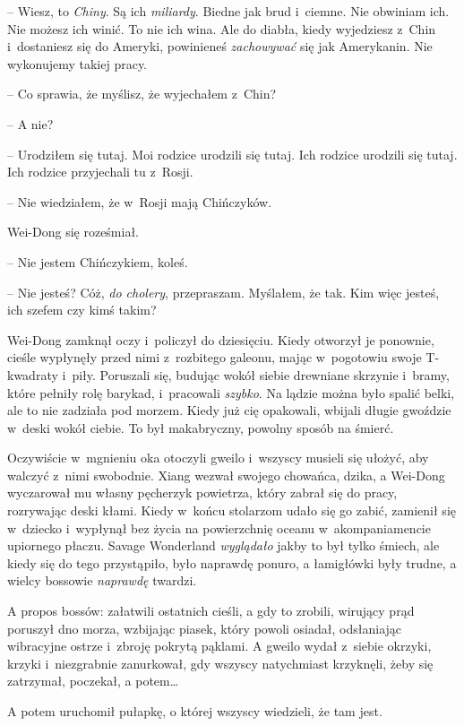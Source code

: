 \documentclass[oneside,polish,11pt,rmheadings]{mwbk}
\begin{document}
-- Wiesz, to \textit{Chiny}. Są ich \textit{miliardy}. Biedne jak brud i~ciemne. Nie obwiniam ich. Nie możesz ich winić. To nie ich wina. Ale do diabła, kiedy wyjedziesz z~Chin i~dostaniesz się do Ameryki, powinieneś \textit{zachowywać }się jak Amerykanin. Nie wykonujemy takiej pracy. 


-- Co sprawia, że myślisz, że wyjechałem z~Chin? 


-- A nie? 


-- Urodziłem się tutaj. Moi rodzice urodzili się tutaj. Ich rodzice urodzili się tutaj. Ich rodzice przyjechali tu z~Rosji. 


-- Nie wiedziałem, że w~Rosji mają Chińczyków. 


Wei-Dong się roześmiał. 

-- Nie jestem Chińczykiem, koleś. 


-- Nie jesteś? Cóż, \textit{do cholery}, przepraszam. Myślałem, że tak. Kim więc jesteś, ich szefem czy kimś takim? 


Wei-Dong zamknął oczy i~policzył do dziesięciu. Kiedy otworzył je ponownie, cieśle wypłynęły przed nimi z~rozbitego galeonu, mając w~pogotowiu swoje T-kwadraty i~piły. Poruszali się, budując wokół siebie drewniane skrzynie i~bramy, które pełniły rolę barykad, i~pracowali \textit{szybko}. Na lądzie można było spalić belki, ale to nie zadziała pod morzem. Kiedy już cię opakowali, wbijali długie gwoździe w~deski wokół ciebie. To był makabryczny, powolny sposób na śmierć. 


Oczywiście w~mgnieniu oka otoczyli gweilo i~wszyscy musieli się ułożyć, aby walczyć z~nimi swobodnie. Xiang wezwał swojego chowańca, dzika, a Wei-Dong wyczarował mu własny pęcherzyk powietrza, który zabrał się do pracy, rozrywając deski kłami. Kiedy w~końcu stolarzom udało się go zabić, zamienił się w~dziecko i~wypłynął bez życia na powierzchnię oceanu w~akompaniamencie upiornego płaczu. Savage Wonderland \textit{wyglądało }jakby to był tylko śmiech, ale kiedy się do tego przystąpiło, było naprawdę ponuro, a łamigłówki były trudne, a wielcy bossowie \textit{naprawdę }twardzi. 


A propos bossów: załatwili ostatnich cieśli, a gdy to zrobili, wirujący prąd poruszył dno morza, wzbijając piasek, który powoli osiadał, odsłaniając wibracyjne ostrze i~zbroję pokrytą pąklami. A gweilo wydał z~siebie okrzyki, krzyki i~niezgrabnie zanurkował, gdy wszyscy natychmiast krzyknęli, żeby się zatrzymał, poczekał, a potem\ldots  


A potem uruchomił pułapkę, o której wszyscy wiedzieli, że tam jest. 
\end{document}
